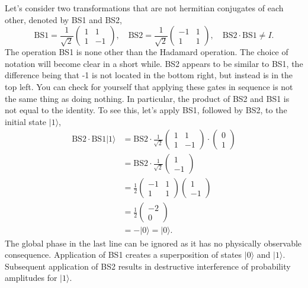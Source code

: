 Let's consider two transformations that are not hermitian conjugates of each other, denoted by BS1 and BS2,
\begin{equation}
    \text{BS}1 = \frac{1}{\sqrt{2}} \begin{pmatrix} 1 & 1 \\ 1 & -1 \end{pmatrix}, \quad
    \text{BS}2 = \frac{1}{\sqrt{2}}\begin{pmatrix} -1 & 1 \\ 1 & 1 \end{pmatrix}, \quad
    \text{BS}2 \cdot \text{BS1} \neq I.
    \label{eq:BS_transformations}
\end{equation}
The operation BS1 is none other than the Hadamard operation.
The choice of notation will become clear in a short while. 
BS2 appears to be similar to BS1, the difference being that -1 is not located in the bottom right, but instead is in the top left.
You can check for yourself that applying these gates in sequence is not the same thing as doing nothing.
In particular, the product of BS2 and BS1 is not equal to the identity.
To see this, let's apply BS1, followed by BS2, to the initial state $|1\rangle$,
\begin{align}
    \text{BS}2 \cdot \text{BS}1 |1\rangle & = \text{BS}2 \cdot \frac{1}{\sqrt{2}} \begin{pmatrix} 1 & 1 \\ 1 & -1 \end{pmatrix} \cdot \begin{pmatrix} 0 \\ 1 \end{pmatrix} \nonumber\\
    & = \text{BS}2 \cdot \frac{1}{\sqrt{2}} \begin{pmatrix} 1 \\ -1 \end{pmatrix} \nonumber\\
    & = \frac{1}{2} \begin{pmatrix} -1 & 1 \\ 1 & 1 \end{pmatrix} \begin{pmatrix} 1 \\ -1 \end{pmatrix} \nonumber\\
    & = \frac{1}{2} \begin{pmatrix} -2 \\ 0 \end{pmatrix} \nonumber\\
    & = -|0\rangle = |0\rangle.
    \label{eq:BS2-BS1}
\end{align}
The global phase in the last line can be ignored as it has no physically observable consequence.
Application of BS1 creates a superposition of states $|0\rangle$ and $|1\rangle$.
Subsequent application of BS2 results in destructive interference of probability amplitudes for $|1\rangle$.

